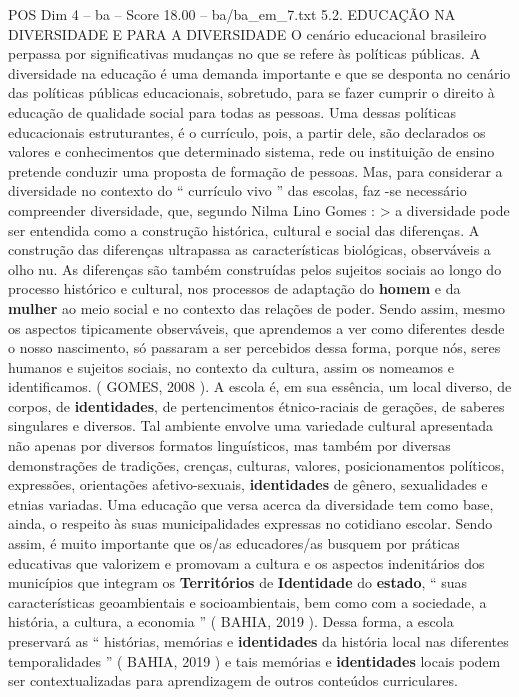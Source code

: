\begin{textsample}{POS Dim 4 – ba – Score 18.00 – ba/ba\_em\_7.txt}  \label{ex:f4_pos_023}
5.2.
EDUCAÇÃO NA DIVERSIDADE E PARA A DIVERSIDADE O cenário educacional brasileiro perpassa por significativas mudanças no que se refere às políticas públicas.
A diversidade na educação é uma demanda importante e que se desponta no cenário das políticas públicas educacionais, sobretudo, para se fazer cumprir o direito à educação de qualidade social para todas as pessoas.
Uma dessas políticas educacionais estruturantes, é o currículo, pois, a partir dele, são declarados os valores e conhecimentos que determinado sistema, rede ou instituição de ensino pretende conduzir uma proposta de formação de pessoas.
Mas, para considerar a diversidade no contexto do “ currículo vivo ” das escolas, faz -se necessário compreender diversidade, que, segundo Nilma Lino Gomes : > a diversidade pode ser entendida como a construção histórica, cultural e social das diferenças.
A construção das diferenças ultrapassa as características biológicas, observáveis a olho nu.
As diferenças são também construídas pelos sujeitos sociais ao longo do processo histórico e cultural, nos processos de adaptação do \textbf{homem} e da \textbf{mulher} ao meio social e no contexto das relações de poder.
Sendo assim, mesmo os aspectos tipicamente observáveis, que aprendemos a ver como diferentes desde o nosso nascimento, só passaram a ser percebidos dessa forma, porque nós, seres humanos e sujeitos sociais, no contexto da cultura, assim os nomeamos e identificamos. ( GOMES, 2008 ).
A escola é, em sua essência, um local diverso, de corpos, de \textbf{identidades}, de pertencimentos étnico-raciais de gerações, de saberes singulares e diversos.
Tal ambiente envolve uma variedade cultural apresentada não apenas por diversos formatos linguísticos, mas também por diversas demonstrações de tradições, crenças, culturas, valores, posicionamentos políticos, expressões, orientações afetivo-sexuais, \textbf{identidades} de gênero, sexualidades e etnias variadas.
Uma educação que versa acerca da diversidade tem como base, ainda, o respeito às suas municipalidades expressas no cotidiano escolar.
Sendo assim, é muito importante que os/as educadores/as busquem por práticas educativas que valorizem e promovam a cultura e os aspectos indenitários dos municípios que integram os \textbf{Territórios} de \textbf{Identidade} do \textbf{estado}, “ suas características geoambientais e socioambientais, bem como com a sociedade, a história, a cultura, a economia ” ( BAHIA, 2019 ).
Dessa forma, a escola preservará as “ histórias, memórias e \textbf{identidades} da história local nas diferentes temporalidades ” ( BAHIA, 2019 ) e tais memórias e \textbf{identidades} locais podem ser contextualizadas para aprendizagem de outros conteúdos curriculares.

\end{textsample}
